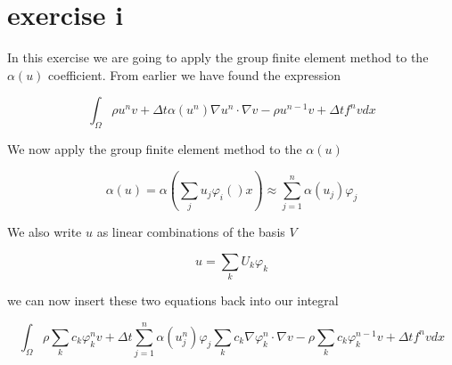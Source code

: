 \section{exercise i}

In this exercise we are going to apply the group finite element method to the $\alpha(u)$ coefficient. From earlier we have found the 
expression

\begin{equation}
 \int_{\Omega} \rho u^nv + \Delta t \alpha(u^n) \nabla u^n \cdot \nabla v - \rho u^{n-1}v + \Delta t f^n v dx
\end{equation}

We now apply the group finite element method to the $\alpha(u)$

\begin{equation}
 \alpha(u) = \alpha \left( \sum_j u_j \varphi_i()x \right) \approx \sum_{j=1}^n \alpha(u_j) \varphi_j
\end{equation}

We also write $u$ as linear combinations of the basis $V$

\begin{equation}
 u = \sum_k U_k \varphi_k
\end{equation}

we can now insert these two equations back into our integral

\begin{equation}
 \int_{\Omega} \rho \sum_k c_k \varphi_k^nv + \Delta t \sum_{j=1}^n \alpha(u_j^n) \varphi_j \sum_k c_k \nabla \varphi_k^n \cdot \nabla v - \rho \sum_k c_k \varphi_k^{n-1}v + \Delta t f^n v dx
\end{equation}


